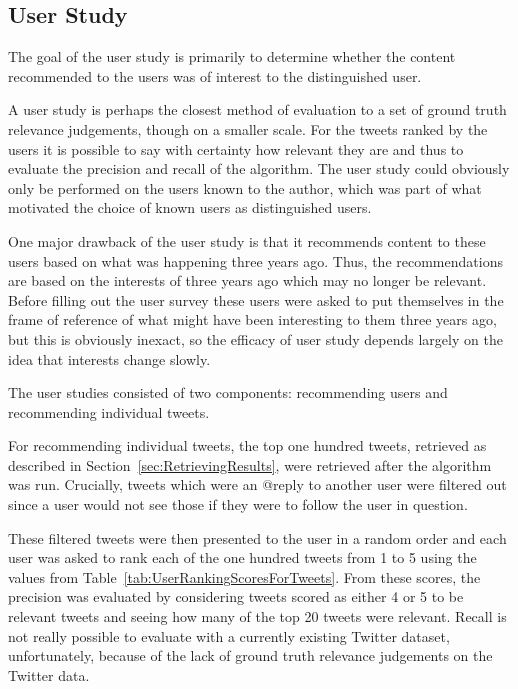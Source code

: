 \subsection{User Study}
\label{sec:UserStudy}

The goal of the user study is primarily to determine whether the content recommended to the users was of interest to the distinguished user.

A user study is perhaps the closest method of evaluation to a set of ground truth relevance judgements, though on a smaller scale. For the tweets ranked by the users it is possible to say with certainty how relevant they are and thus to evaluate the precision and recall of the algorithm. The user study could obviously only be performed on the users known to the author, which was part of what motivated the choice of known users as distinguished users.

One major drawback of the user study is that it recommends content to these users based on what was happening three years ago. Thus, the recommendations are based on the interests of three years ago which may no longer be relevant. Before filling out the user survey these users were asked to put themselves in the frame of reference of what might have been interesting to them three years ago, but this is obviously inexact, so the efficacy of user study depends largely on the idea that interests change slowly.

The user studies consisted of two components: recommending users and recommending individual tweets. 


For recommending individual tweets, the top one hundred tweets, retrieved as described in Section~\ref{sec:RetrievingResults}, were retrieved after the algorithm was run. Crucially, tweets which were an @reply to another user were filtered out since a user would not see those if they were to follow the user in question.

These filtered tweets were then presented to the user in a random order and each user was asked to rank each of the one hundred tweets from 1 to 5 using the values from Table~\ref{tab:UserRankingScoresForTweets}. From these scores, the precision was evaluated by considering tweets scored as either 4 or 5 to be relevant tweets and seeing how many of the top 20 tweets were relevant. Recall is not really possible to evaluate with a currently existing Twitter dataset, unfortunately, because of the lack of ground truth relevance judgements on the Twitter data.

